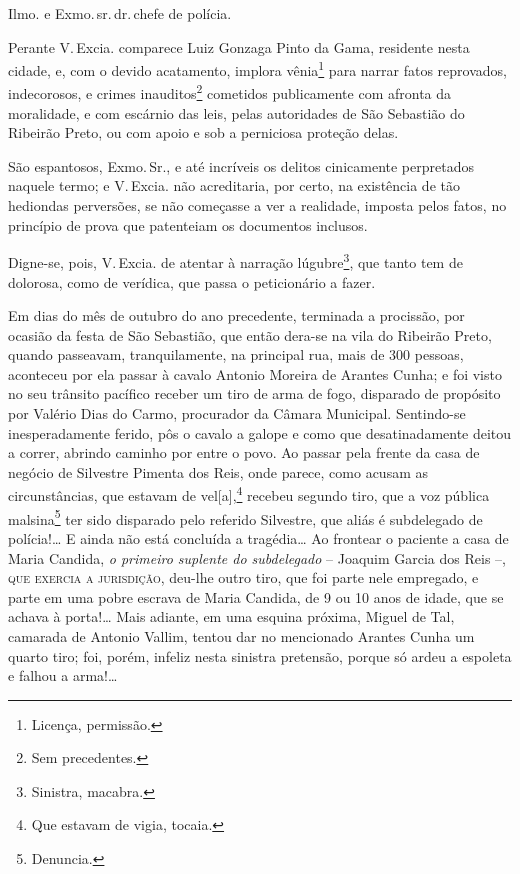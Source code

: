 Ilmo. e Exmo.\,sr.\,dr.\,chefe de polícia.

Perante V.\,Excia. comparece Luiz Gonzaga Pinto da Gama, residente nesta
cidade, e, com o devido acatamento, implora vênia\footnote{ Licença,
  permissão.} para narrar fatos reprovados, indecorosos, e crimes
inauditos\footnote{ Sem precedentes.} cometidos publicamente com
afronta da moralidade, e com escárnio das leis, pelas autoridades de São
Sebastião do Ribeirão Preto, ou com apoio e sob a perniciosa proteção
delas.

São espantosos, Exmo.\,Sr., e até incríveis os delitos cinicamente
perpretados naquele termo; e V.\,Excia. não acreditaria, por certo, na
existência de tão hediondas perversões, se não começasse a ver a
realidade, imposta pelos fatos, no princípio de prova que patenteiam os
documentos inclusos.

Digne-se, pois, V.\,Excia. de atentar à narração lúgubre\footnote{
  Sinistra, macabra.}, que tanto tem de dolorosa, como de verídica, que
passa o peticionário a fazer.

Em dias do mês de outubro do ano precedente, terminada a procissão, por
ocasião da festa de São Sebastião, que então dera-se na vila do Ribeirão
Preto, quando passeavam, tranquilamente, na principal rua, mais de 300
pessoas, aconteceu por ela passar à cavalo Antonio Moreira de Arantes
Cunha; e foi visto no seu trânsito pacífico receber um tiro de arma de
fogo, disparado de propósito por Valério Dias do Carmo, procurador da
Câmara Municipal. Sentindo-se inesperadamente ferido, pôs o cavalo a
galope e como que desatinadamente deitou a correr, abrindo caminho por
entre o povo. Ao passar pela frente da casa de negócio de Silvestre
Pimenta dos Reis, onde parece, como acusam as circunstâncias, que
estavam de vel{[}a{]},\footnote{ Que estavam de vigia, tocaia.} recebeu
segundo tiro, que a voz pública malsina\footnote{ Denuncia.} ter sido
disparado pelo referido Silvestre, que aliás é subdelegado de
polícia!\ldots{} E ainda não está concluída a tragédia\ldots{} Ao frontear o
paciente a casa de Maria Candida, \emph{o primeiro suplente do
subdelegado} -- Joaquim Garcia dos Reis --, \textsc{que exercia a jurisdição},
deu-lhe outro tiro, que foi parte nele empregado, e parte em uma pobre
escrava de Maria Candida, de 9 ou 10 anos de idade, que se achava à
porta!\ldots{} Mais adiante, em uma esquina próxima, Miguel de Tal, camarada
de Antonio Vallim, tentou dar no mencionado Arantes Cunha um quarto
tiro; foi, porém, infeliz nesta sinistra pretensão, porque só ardeu a
espoleta e falhou a arma!\ldots{}


